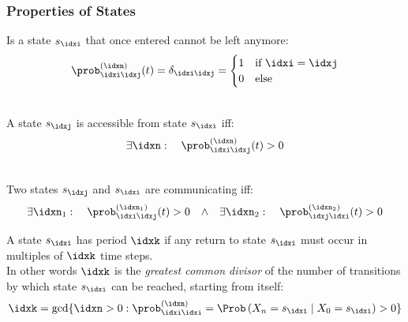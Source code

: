 \subsubsection{Properties of States}\label{subsubsec:states}
\begin{defnbox}\nospacing
  \begin{defn}\label{defn:absorbing_state}
    Is a state $s_{\idxi}$ that once entered cannot be left anymore:
    \begin{align}
      \prob^{(\idxn)}_{\idxi\idxj}(t)=\delta_{\idxi\idxj}=
      \begin{cases}
        1&\text{if }\idxi=\idxj\\
        0&\text{else}
      \end{cases}
    \end{align}
  \end{defn}
\end{defnbox}
\begin{defnbox}\nospacing
  \begin{defn}\label{defn:accessible_state}\leavevmode\\
    A state $s_{\idxj}$ is accessible from state $s_{\idxi}$ iff:
    \begin{align}
      \exists\idxn:\quad\prob^{(\idxn)}_{\idxi\idxj}(t)>0
    \end{align}
  \end{defn}
\end{defnbox}
\begin{defnbox}\nospacing
  \begin{defn}\label{defn:communicating_states}
    \leavevmode\\
    Two states $s_{\idxj}$ and $s_{\idxi}$ are communicating iff:
    \begin{align}
      \exists\idxn_{1}:\quad\prob^{(\idxn_{1})}_{\idxi\idxj}(t)>0&&\land&&\exists\idxn_{2}:\quad\prob^{(\idxn_{2})}_{\idxj\idxi}(t)>0
    \end{align}
  \end{defn}
\end{defnbox}
\begin{defnbox}\nospacing
  \begin{defn}\label{defn:periodicity_of_states}
    A state $s_{\idxi}$ has period $\idxk$ if any return to state $s_{\idxi}$ must occur in multiples of $\idxk$ time steps.\\
    In other words $\idxk$ is the \textit{greatest common divisor}
    of the number of transitions by which state $s_{\idxi}$ can be reached, starting from itself:
    \begin{align}
      \idxk=\gcd\{\idxn>0:\prob^{(\idxn)}_{\idxi\idxi}=\Prob \left(X_{n}=s_{\idxi}\mid X_{0}=s_{\idxi}\right)>0\}
    \end{align}
  \end{defn}
\end{defnbox}
